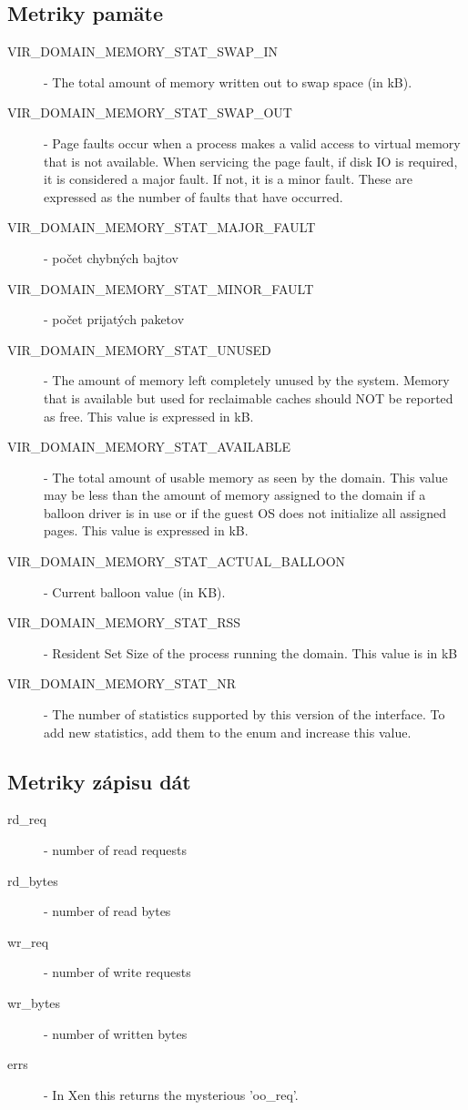 \documentclass[11pt,final,oneside]{fithesis}
\begin{document}
\subsection{Metriky pamäte}
\begin{description}
\item[VIR\_DOMAIN\_MEMORY\_STAT\_SWAP\_IN] - The total amount of memory written out to swap space (in kB).
\item[VIR\_DOMAIN\_MEMORY\_STAT\_SWAP\_OUT] - Page faults occur when a process makes a valid access to virtual memory that is not available. When servicing the page fault, if disk IO is required, it is considered a major fault. If not, it is a minor fault. These are expressed as the number of faults that have occurred.
\item[VIR\_DOMAIN\_MEMORY\_STAT\_MAJOR\_FAULT] - počet chybných bajtov
\item[VIR\_DOMAIN\_MEMORY\_STAT\_MINOR\_FAULT] - počet prijatých paketov
\item[VIR\_DOMAIN\_MEMORY\_STAT\_UNUSED] - The amount of memory left completely unused by the system. Memory that is available but used for reclaimable caches should NOT be reported as free. This value is expressed in kB.
\item[VIR\_DOMAIN\_MEMORY\_STAT\_AVAILABLE] - The total amount of usable memory as seen by the domain. This value may be less than the amount of memory assigned to the domain if a balloon driver is in use or if the guest OS does not initialize all assigned pages. This value is expressed in kB.
\item[VIR\_DOMAIN\_MEMORY\_STAT\_ACTUAL\_BALLOON] - Current balloon value (in KB).
\item[VIR\_DOMAIN\_MEMORY\_STAT\_RSS] - Resident Set Size of the process running the domain. This value is in kB
\item[VIR\_DOMAIN\_MEMORY\_STAT\_NR] - The number of statistics supported by this version of the interface. To add new statistics, add them to the enum and increase this value.
\end{description}

\subsection{Metriky zápisu dát}
\begin{description}
\item[rd\_req] - number of read requests
\item[rd\_bytes] - number of read bytes
\item[wr\_req] - number of write requests
\item[wr\_bytes] - number of written bytes
\item[errs] - In Xen this returns the mysterious 'oo\_req'.
\end{description}
\end{document}
